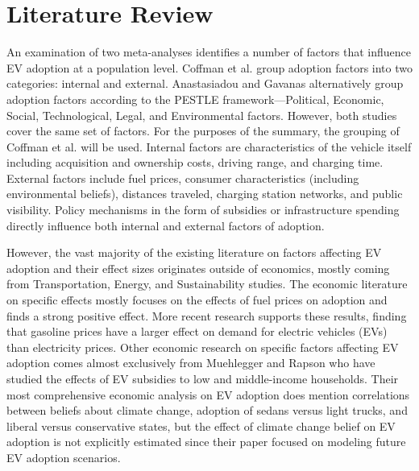 \documentclass{article}
\begin{document}
\section{Literature Review}

An examination of two meta-analyses identifies a number of factors that influence EV adoption at a population level. Coffman et al. group adoption factors into two categories: internal and external. \autocite{coffman_bernstein_wee_2016} Anastasiadou and Gavanas alternatively group adoption factors according to the PESTLE framework—Political, Economic, Social, Technological, Legal, and Environmental factors. \autocite{anastasiadou_gavanas_2022} However, both studies cover the same set of factors. For the purposes of the summary, the grouping of Coffman et al. will be used. Internal factors are characteristics of the vehicle itself including acquisition and ownership costs, driving range, and charging time. External factors include fuel prices, consumer characteristics (including environmental beliefs), distances traveled, charging station networks, and public visibility. Policy mechanisms in the form of subsidies or infrastructure spending directly influence both internal and external factors of adoption.

However, the vast majority of the existing literature on factors affecting EV adoption and their effect sizes originates outside of economics, mostly coming from Transportation, Energy, and Sustainability studies. The economic literature on specific effects mostly focuses on the effects of fuel prices on adoption and finds a strong positive effect. \autocite{beresteanu_li_2011, gallagher_muehlegger_2011} More recent research supports these results, finding that gasoline prices have a larger effect on demand for electric vehicles (EVs) than electricity prices. \autocite{NBERw29842} Other economic research on specific factors affecting EV adoption comes almost exclusively from Muehlegger and Rapson who have studied the effects of EV subsidies to low and middle-income households. \autocite{NBERw25359} Their most comprehensive economic analysis on EV adoption does mention correlations between beliefs about climate change, adoption of sedans versus light trucks, and liberal versus conservative states, but the effect of climate change belief on EV adoption is not explicitly estimated since their paper focused on modeling future EV adoption scenarios.
\end{document}
